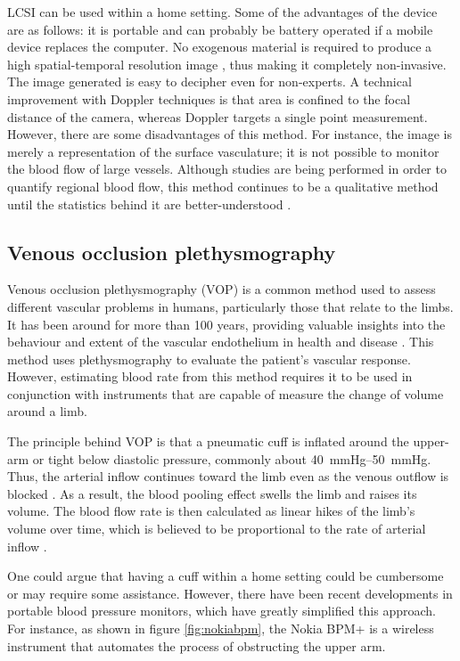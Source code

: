 LCSI can be used within a home setting. Some of the advantages of the device are as follows: it is portable and can probably be battery operated if a mobile device replaces the computer. No exogenous material is required to produce a high spatial-temporal resolution image \cite{duncan2008can}, thus making it completely non-invasive. The image generated is easy to decipher even for non-experts. A technical improvement with Doppler techniques is that area is confined to the focal distance of the camera, whereas Doppler targets a single point measurement. However, there are some disadvantages of this method. For instance, the image is merely a representation of the surface vasculature; it is not possible to monitor the blood flow of large vessels. Although studies are being performed in order to quantify regional blood flow, this method continues to be a qualitative method until the statistics behind it are better-understood \cite{duncan2008can}. 

\subsection{Venous occlusion plethysmography}
\label{section literature VOP}
Venous occlusion plethysmography (VOP) is a common method used to assess different vascular problems in humans, particularly those that relate to the limbs. It has been around for more than 100 years, providing valuable insights into the behaviour and extent of the vascular endothelium in health and disease \cite{joyner2001belfast}. This method uses plethysmography to evaluate the patient's vascular response. However, estimating blood rate from this method requires it to be used in conjunction with instruments that are capable of measure the change of volume around a limb.

The principle behind VOP is that a pneumatic cuff is inflated around the upper-arm or tight below diastolic pressure, commonly about \SIrange{40}{50}{\mmHg}. Thus, the arterial inflow continues toward the limb even as the venous outflow is blocked \cite{casey2008measuring, joyner2001belfast}. As a result, the blood pooling effect swells the limb and raises its volume. The blood flow rate is then calculated as linear hikes of the limb's volume over time, which is believed to be proportional to the rate of arterial inflow \cite{casey2008measuring, joannides2006clinical}.

One could argue that having a cuff within a home setting could be cumbersome or may require some assistance. However, there have been recent developments in portable blood pressure monitors, which have greatly simplified this approach. For instance, as shown in figure \ref{fig:nokiabpm}, the Nokia BPM+ \cite{nokiabpm} is a wireless instrument that automates the process of obstructing the upper arm.

